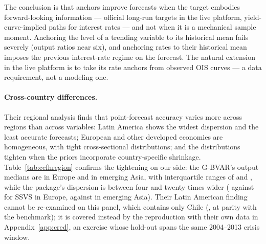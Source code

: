 The conclusion is that anchors improve forecasts when the target embodies
forward-looking information --- official long-run targets in the live platform,
yield-curve-implied paths for interest rates --- and not when it is a mechanical sample
moment. Anchoring the level of a trending variable to its historical mean fails severely
(output ratios near six), and anchoring rates to their historical mean imposes the
previous interest-rate regime on the forecast. The natural extension in the live platform
is to take its rate anchors from observed OIS curves --- a data requirement, not a
modeling one.

\begin{table}[t]
\centering
\caption{Cross-country differences, following the regional analysis of
\citet{CrespoFeldkircherHuber2016}: median $\{$interquartile range$\}$ of country-level
relative RMSE against the AR(5), output, one quarter ahead. Latin America contains only
Chile on this panel.}
\label{tab:ccfhregion}
\footnotesize\setlength{\tabcolsep}{4pt}
\begin{center}

\end{center}
\end{table}

\paragraph{Cross-country differences.} Their regional analysis finds that point-forecast
accuracy varies more across regions than across variables: Latin America shows the widest
dispersion and the least accurate forecasts; European and other developed economies are
homogeneous, with tight cross-sectional distributions; and the distributions tighten when
the priors incorporate country-specific shrinkage. Table~\ref{tab:ccfhregion} confirms
the tightening on our side: the G-BVAR's output medians are \CmRegEuYMed{} in Europe and
\CmRegAsiaYMed{} in emerging Asia, with interquartile ranges of \CmRegEuYIqr{} and
\CmRegAsiaYIqr{}, while the package's dispersion is between four and twenty times wider
(\CmRegSsvsEuYIqr{} against \CmRegEuYIqr{} for SSVS in Europe, \CmRegSsvsAsiaYIqr{}
against \CmRegAsiaYIqr{} in emerging Asia). Their Latin American finding cannot be
re-examined on this panel, which contains only Chile (\CmRegClY{}, at parity with the
benchmark); it is covered instead by the reproduction with their own data in
Appendix~\ref{app:cred}, an exercise whose hold-out spans the same 2004--2013 crisis
window.

